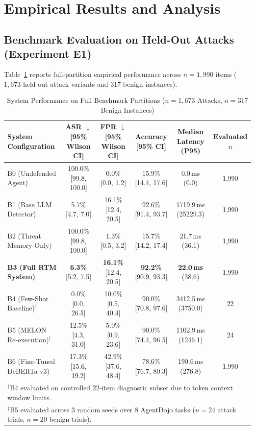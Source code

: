 \documentclass[conference]{IEEEtran}
\begin{document}
\section{Empirical Results and Analysis}

\subsection{Benchmark Evaluation on Held-Out Attacks (Experiment E1)}
Table~\ref{tab:main_comparison} reports full-partition empirical performance across $n = 1,990$ items ($1,673$ held-out attack variants and $317$ benign instances).

\begin{table}[t]
\centering
\caption{System Performance on Full Benchmark Partitions ($n=1,673$ Attacks, $n=317$ Benign Instances)}
\label{tab:main_comparison}
\begin{tabular}{l c c c c c}
\hline
\textbf{System Configuration} & \textbf{ASR} $\downarrow$ [95\% Wilson CI] & \textbf{FPR} $\downarrow$ [95\% Wilson CI] & \textbf{Accuracy} [95\% CI] & \textbf{Median Latency (P95)} & \textbf{Evaluated $n$} \\
\hline
B0 (Undefended Agent) & 100.0\% [99.8, 100.0] & 0.0\% [0.0, 1.2] & 15.9\% [14.4, 17.6] & 0.0\,ms (0.0) & 1,990 \\
B1 (Base LLM Detector) & 5.7\% [4.7, 7.0] & 16.1\% [12.4, 20.5] & 92.6\% [91.4, 93.7] & 1719.9\,ms (25229.3) & 1,990 \\
B2 (Threat Memory Only) & 100.0\% [99.8, 100.0] & 1.3\% [0.5, 3.2] & 15.7\% [14.2, 17.4] & 21.7\,ms (36.1) & 1,990 \\
\textbf{B3 (Full RTM System)} & \textbf{6.3\%} [5.2, 7.5] & \textbf{16.1\%} [12.4, 20.5] & \textbf{92.2\%} [90.9, 93.3] & \textbf{22.0\,ms} (38.6) & 1,990 \\
B4 (Few-Shot Baseline)$^\dagger$ & 0.0\% [0.0, 26.5] & 10.0\% [0.5, 40.4] & 90.0\% [70.8, 97.6] & 3412.5\,ms (3750.0) & 22 \\
B5 (MELON Re-execution)$^\ddagger$ & 12.5\% [4.3, 31.0] & 5.0\% [0.9, 23.6] & 90.0\% [74.4, 96.5] & 1102.9\,ms (1246.1) & 24 \\
B6 (Fine-Tuned DeBERTa-v3) & 17.3\% [15.6, 19.2] & 42.9\% [37.6, 48.4] & 78.6\% [76.7, 80.3] & 190.6\,ms (276.8) & 1,990 \\
\hline
\multicolumn{6}{l}{\small $^\dagger$B4 evaluated on controlled 22-item diagnostic subset due to token context window limits.} \\
\multicolumn{6}{l}{\small $^\ddagger$B5 evaluated across 3 random seeds over 8 AgentDojo tasks ($n=24$ attack trials, $n=20$ benign trials).} \\
\hline
\end{tabular}
\end{table}
\end{document}
